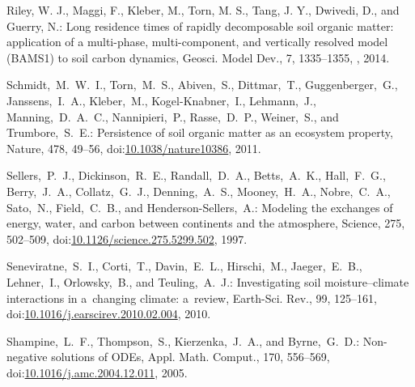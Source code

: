 \documentclass[gmd,noline]{copernicus}
\begin{document}
\begin{thebibliography}{55}
Riley, W. J., Maggi, F., Kleber, M., Torn, M. S., Tang, J. Y., Dwivedi, D.,
and Guerry, N.: Long residence times of rapidly decomposable soil organic
matter: application of a multi-phase, multi-component, and vertically
resolved model (BAMS1) to soil carbon dynamics, Geosci. Model Dev., 7,
1335--1355, , 2014.





Schmidt,~M.~W.~I., Torn,~M.~S., Abiven,~S., Dittmar,~T., Guggenberger,~G.,
Janssens,~I.~A., Kleber,~M., Kogel-Knabner,~I., Lehmann,~J.,
Manning,~D.~A.~C., Nannipieri,~P., Rasse,~D.~P., Weiner,~S., and
Trumbore,~S.~E.: Persistence of soil organic matter as an ecosystem property,
Nature, 478, 49--56,
doi:\href{http://dx.doi.org/10.1038/nature10386}{10.1038/nature10386}, 2011.


Sellers,~P.~J., Dickinson,~R.~E., Randall,~D.~A., Betts,~A.~K., Hall,~F.~G.,
Berry,~J.~A., Collatz,~G.~J., Denning,~A.~S., Mooney,~H.~A., Nobre,~C.~A.,
Sato,~N., Field,~C.~B., and Henderson-Sellers,~A.: Modeling the exchanges of
energy, water, and carbon between continents and the atmosphere, Science,
275, 502--509,
doi:\href{http://dx.doi.org/10.1126/science.275.5299.502}{10.1126/science.275.5299.502},
1997.


Seneviratne,~S.~I., Corti,~T., Davin,~E.~L., Hirschi,~M., Jaeger,~E.~B., Lehner,~I., Orlowsky,~B., and Teuling,~A.~J.:
Investigating soil moisture--climate interactions in a~changing climate: a~review,
Earth-Sci. Rev.,
99, 125--161,
doi:\href{http://dx.doi.org/10.1016/j.earscirev.2010.02.004}{10.1016/j.earscirev.2010.02.004}, 2010.


Shampine,~L.~F., Thompson,~S., Kierzenka,~J.~A., and Byrne,~G.~D.:
Non-negative solutions of ODEs,
Appl. Math. Comput.,
170, 556--569,
doi:\href{http://dx.doi.org/10.1016/j.amc.2004.12.011}{10.1016/j.amc.2004.12.011}, 2005.



\end{thebibliography}
\end{document}
